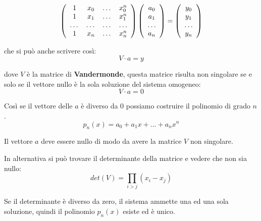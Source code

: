 \begin{equation}
    \left(
        \begin{array}{c c c c}
            1 & x_0 & \dots & x_0^n \\
            1 & x_1 & \dots & x_1^n \\
            \dots & \dots & \dots & \dots \\
            1 & x_n & \dots & x_n^n
        \end{array}
    \right)
    \left(
        \begin{array}{c}
            a_0 \\
            a_1 \\
            \dots \\
            a_n
        \end{array}
    \right)
    =
    \left(
        \begin{array}{c}
            y_0 \\
            y_1 \\
            \dots \\
            y_n
        \end{array}
    \right)
\end{equation}

che si può anche scrivere così:
\begin{equation}
    V \cdot a = y
\end{equation}

dove $V$ è la matrice di \textbf{Vandermonde}, questa matrice risulta non singolare se e solo se
il vettore nullo è la sola soluzione del sistema omogeneo:
\begin{equation}
    V \cdot a = 0
\end{equation}

Così se il vettore delle $a$ è diverso da 0 possiamo costruire il polinomio di grado $n$.
\begin{equation}
    p_n(x) = a_0 + a_1x + \dots + a_nx^n
\end{equation}

Il vettore $a$ deve essere nullo di modo da avere la matrice $V$ non singolare.

In alternativa si può trovare il determinante della matrice e vedere che non sia nullo:
\begin{equation}
    det(V) = \prod_{i>j}{(x_i-x_j)}
\end{equation}

Se il determinante è diverso da zero, il sistema ammette una ed una sola soluzione, quindi
il polinomio $p_n(x)$ esiste ed è unico.


